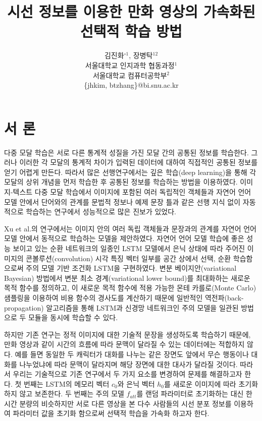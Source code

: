 \documentclass{kcc}
\title{시선 정보를 이용한 만화 영상의 가속화된 선택적 학습 방법}
\author{
김진화$^{\circ1}$, 장병탁$^{12}$\\
서울대학교 인지과학 협동과정$^{1}$\\
서울대학교 컴퓨터공학부$^{2}$\\
\{jhkim, btzhang\}@bi.snu.ac.kr
}
\begin{document}
\maketitle


\section{서 론}

다중 모달 학습은 서로 다른 통계적 성질을 가진 모달 간의 공통된 정보를 학습한다. 그러나 이러한 각 모달의 통계적 차이가 입력된 데이터에 대하여 직접적인 공통된 정보를 얻기 어렵게 만든다. 따라서 많은 선행연구에서는 깊은 학습(deep learning)을 통해 각 모달의 상위 개념을 먼저 학습한 후 공통된 정보를 학습하는 방법을 이용하였다\cite{Ngiam2011,NIPS2012_4683,Kiros2013,NIPS2014_5279}. 이미지-텍스트 다중 모달 학습에서 이미지에 포함된 여러 독립적인 객체들과 자연어 언어 모델 안에서 단어와의 관계를 문법적 정보나 예제 문장 틀과 같은 선행 지식 없이 자동적으로 학습하는 연구에서 성능적으로 많은 진보가 있었다\cite{Kiros2013,Yu2013,Karpathy}.

Xu et al.\cite{Xu2015}의 연구에서는 이미지 안의 여러 독립 객체들과 문장과의 관계를 자연어 언어 모델 안에서 동적으로 학습하는 모델을 제안하였다. 자연어 언어 모델 학습에 좋은 성능 보이고 있는 순환 네트워크의 일종인 LSTM 모델에서 은닉 상태에 따라 주어진 이미지의 콘볼루션(convolution) 시각 특징 벡터 일부를 공간 상에서 선택, 순환 학습함으로써 주의 모델 기반 조건화 LSTM을 구현하였다. 변분 베이지안(variational Bayesian) 방법에서 변분 최소 경계(variational lower bound)를 최대화하는 새로운 목적 함수를 정의하고, 이 새로운 목적 함수에 적용 가능한 몬테 카를로(Monte Carlo) 샘플링을 이용하여 비용 함수의 경사도를 계산하기 때문에 일반적인 역전파(back-propagation) 알고리즘을 통해 LSTM과 신경망 네트워크인 주의 모델을 일관된 방법으로 두 모듈을 동시에 학습할 수 있다.

하지만 기존 연구는 정적 이미지에 대한 기술적 문장을 생성하도록 학습하기 때문에, 만화 영상과 같이 시간의 흐름에 따라 문맥이 달라질 수 있는 데이터에는 적합하지 않다. 예를 들면 동일한 두 캐릭터가 대화를 나누는 같은 장면도 앞에서 무슨 행동이나 대화를 나누었냐에 따라 문맥이 달라지며 해당 장면에 대한 대사가 달라질 것이다. 따라서 우리는 기술적으로 기존 연구에서 두 가지 요소를 변경하여 문제를 해결하고자 한다. 첫 번째는 LSTM의 메모리 벡터 $c_0$와 은닉 벡터 $h_0$를 새로운 이미지에 따라 초기화 하지 않고 보존한다. 두 번째는 주의 모델 $f_{att}$를 랜덤 파라미터로 초기화하는 대신 한 시간 분량의 비슷하지만 서로 다른 영상을 본 다수 사람들의 시선 분포 정보를 이용하여 파라미터 값을 초기화 함으로써 선택적 학습을 가속화 하고자 한다.  
\end{document}
